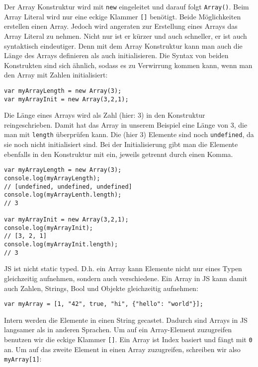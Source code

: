 \documentclass{book}
\begin{document}
Der Array Konstruktur wird mit \lstinline|new| eingeleitet und darauf folgt \lstinline|Array()|. Beim Array Literal wird nur eine eckige Klammer \lstinline|[]| benötigt. Beide Möglichkeiten erstellen einen Array. Jedoch wird angeraten zur Erstellung eines Arrays das Array Literal zu nehmen. Nicht nur ist er kürzer und auch schneller, er ist auch syntaktisch eindeutiger. Denn mit dem Array Konstruktur kann man auch die Länge des Arrays definieren als auch initialisieren. Die Syntax von beiden Konstrukten sind sich ähnlich, sodass es zu Verwirrung kommen kann, wenn man den Array mit Zahlen initialisiert:

\begin{lstlisting}[caption=Array Konstruktor]
var myArrayLength = new Array(3);
var myArrayInit = new Array(3,2,1);
\end{lstlisting}

Die Länge eines Arrays wird als Zahl (hier: 3) in den Konstruktur reingeschrieben. Damit hat das Array in unserem Beispiel eine Länge von 3, die man mit \lstinline|length| überprüfen kann. Die (hier 3) Elemente sind noch \lstinline|undefined|, da sie noch nicht initialisiert sind. Bei der Initialisierung gibt man die Elemente ebenfalls in den Konstruktur mit ein, jeweils getrennt durch einen Komma. 
\begin{lstlisting}[caption=Array Konstruktor]
var myArrayLength = new Array(3);
console.log(myArrayLength); 
// [undefined, undefined, undefined]
console.log(myArrayLenth.length); 
// 3

var myArrayInit = new Array(3,2,1);
console.log(myArrayInit); 
// [3, 2, 1]
console.log(myArrayInit.length); 
// 3
\end{lstlisting}

JS ist nicht static typed. D.h. ein Array kann Elemente nicht nur eines Typen gleichzeitig aufnehmen, sondern auch verschiedene. Ein Array in JS kann damit auch Zahlen, Strings, Bool und Objekte gleichzeitig aufnehmen:

\begin{lstlisting}[caption=Array Konstruktor]
var myArray = [1, "42", true, "hi", {"hello": "world"}];
\end{lstlisting}

Intern werden die Elemente in einen String gecastet. Dadurch sind Arrays in JS langsamer als in anderen Sprachen. Um auf ein Array-Element zuzugreifen benutzen wir die eckige Klammer \lstinline|[]|. Ein Array ist Index basiert und fängt mit \lstinline|0| an. Um auf das zweite Element in einen Array zuzugreifen, schreiben wir also \lstinline|myArray[1]|:
\end{document}

